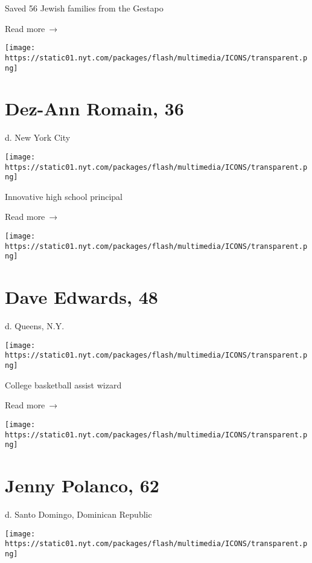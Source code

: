 Saved 56 Jewish families from the Gestapo

 Read more~→

\href{https://www.nytimes.com/2020/03/27/obituaries/dez-ann-roman-dead-coronavirus.html}{}

\texttt{[image: https://static01.nyt.com/packages/flash/multimedia/ICONS/transparent.png]}

\hypertarget{dez-ann-romain-36}{%
\section{Dez-Ann Romain, 36}\label{dez-ann-romain-36}}

d. New York City

\texttt{[image: https://static01.nyt.com/packages/flash/multimedia/ICONS/transparent.png]}

Innovative high school principal

 Read more~→

\href{https://www.nytimes.com/2020/03/27/obituaries/dave-edwards-dead-coronavirus.html}{}

\texttt{[image: https://static01.nyt.com/packages/flash/multimedia/ICONS/transparent.png]}

\hypertarget{dave-edwards-48}{%
\section{Dave Edwards, 48}\label{dave-edwards-48}}

d. Queens, N.Y.

\texttt{[image: https://static01.nyt.com/packages/flash/multimedia/ICONS/transparent.png]}

College basketball assist wizard

 Read more~→

\href{https://www.nytimes.com/2020/03/27/obituaries/jenny-polanco-dead-coronavirus.html}{}

\texttt{[image: https://static01.nyt.com/packages/flash/multimedia/ICONS/transparent.png]}

\hypertarget{jenny-polanco-62}{%
\section{Jenny Polanco, 62}\label{jenny-polanco-62}}

d. Santo Domingo, Dominican Republic

\texttt{[image: https://static01.nyt.com/packages/flash/multimedia/ICONS/transparent.png]}

